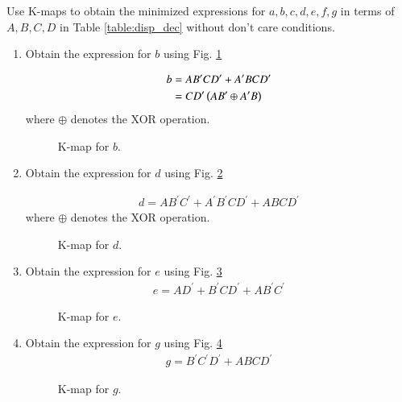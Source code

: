 Use K-maps to obtain the minimized expressions for 
$a,b,c,d,e,f,g$ in terms of $A,B,C,D$ in Table \ref{table:disp_dec} 
without don't care conditions.

\renewcommand{\theequation}{\theenumi}
\renewcommand{\thefigure}{\theenumi}
\begin{enumerate}[label=\thesubsection.\arabic*.,ref=\thesubsection.\theenumi]

\item Obtain the expression for $b$ using Fig. \ref{fig:disp_kmap_b}


\solution

\begin{align}
\label{eq:kmap_disp_b}
b &= A B^{\prime}C D^{\prime} + A^{\prime}B C D^{\prime}
\\
&=C D^{\prime}\left(A B^{\prime} \oplus A^{\prime}B\right)
\end{align}
%
where $\oplus$ denotes the XOR operation.
\begin{figure}[!ht]
\centering
\resizebox{\columnwidth}{!} {

}
\caption{K-map for $b$.}
\label{fig:disp_kmap_b}
\end{figure}
%
\item Obtain the expression for $d$ using Fig. \ref{fig:disp_kmap_d}
\solution


\begin{align}
\label{eq:kmap_disp_d}
d=AB^{\prime}C^{\prime}+A^{\prime}B^{\prime}CD^{\prime}+ABCD^{\prime}
\end{align}
%
where $\oplus$ denotes the XOR operation.
\begin{figure}[!ht]
\centering
\resizebox{\columnwidth}{!} {

}
\caption{K-map for $d$.}
\label{fig:disp_kmap_d}
\end{figure}
\item Obtain the expression for $e$ using Fig. \ref{fig:disp_kmap_e}
%
\begin{align}
\label{eq:kmap_disp_e}
e=AD^{\prime}+B^{\prime}CD^{\prime}+AB^{\prime}C^{\prime}
\end{align}
%
\begin{figure}[!ht]
\centering
\resizebox{\columnwidth}{!} {

}
\caption{K-map for $e$.}
\label{fig:disp_kmap_e}
\end{figure}

%
\item Obtain the expression for $g$ using Fig. \ref{fig:disp_kmap_g}
%
\begin{align}
\label{eq:kmap_disp_g}
g = B^{\prime}C^{\prime}D^{\prime}+ABCD^{\prime}
\end{align}
%
\begin{figure}[!ht]
\centering
\resizebox{\columnwidth}{!} {

}
\caption{K-map for $g$.}
\label{fig:disp_kmap_g}
\end{figure}
\end{enumerate}
%
%
